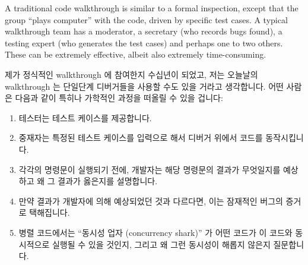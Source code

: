 A traditional code walkthrough is similar to a formal inspection,
except that the group
``plays computer'' with the code, driven by specific test cases.
A typical walkthrough team has a moderator, a secretary (who records
bugs found), a testing expert (who generates the test cases) and
perhaps one to two others.
These can be extremely effective, albeit also extremely time-consuming.
\fi

제가 정식적인 walkthrough 에 참여한지 수십년이 되었고, 저는 오늘날의
walkthrough 는 단일단계 디버거들을 사용할 수도 있을 거라고 생각합니다.
어떤 사람은 다음과 같이 특히나 가학적인 과정을 떠올릴 수 있을 겁니다:

\begin{enumerate}
\item	테스터는 테스트 케이스를 제공합니다.
\item	중재자는 특정된 테스트 케이스를 입력으로 해서 디버거 위에서 코드를
	동작시킵니다.
\item	각각의 명령문이 실행되기 전에, 개발자는 해당 명령문의 결과가 무엇일지를
	예상하고 왜 그 결과가 옳은지를 설명합니다.
\item	만약 결과가 개발자에 의해 예상되었던 것과 다르다면, 이는 잠재적인
	버그의 증거로 택해집니다.
\item	병렬 코드에서는 ``동시성 업자 (concurrency shark)'' 가 어떤 코드가 이
	코드와 동시적으로 실행될 수 있을 것인지, 그리고 왜 그런 동시성이 해롭지
	않은지 질문합니다.

\end{enumerate}

